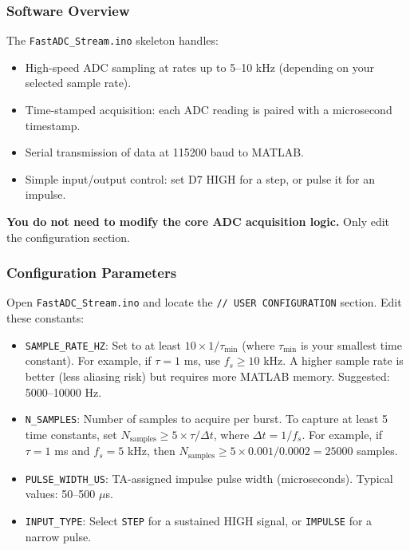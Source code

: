 \documentclass[11pt,letterpaper]{article}
\begin{document}
\subsubsection*{Software Overview}

The \texttt{FastADC\_Stream.ino} skeleton handles:
\begin{itemize}
    \item High-speed ADC sampling at rates up to 5--10 kHz (depending on your selected sample rate).
    \item Time-stamped acquisition: each ADC reading is paired with a microsecond timestamp.
    \item Serial transmission of data at 115200 baud to MATLAB.
    \item Simple input/output control: set D7 HIGH for a step, or pulse it for an impulse.
\end{itemize}

\noindent
\textbf{You do not need to modify the core ADC acquisition logic.} Only edit the configuration section.

\subsubsection*{Configuration Parameters}

Open \texttt{FastADC\_Stream.ino} and locate the \texttt{// USER CONFIGURATION} section. Edit these constants:

\begin{itemize}
    \item \texttt{SAMPLE\_RATE\_HZ}: Set to at least $10 \times 1/\tau_{\min}$ (where $\tau_{\min}$ is your smallest time constant). For example, if $\tau = 1$ ms, use $f_s \ge 10$ kHz. A higher sample rate is better (less aliasing risk) but requires more MATLAB memory. Suggested: 5000--10000 Hz.

    \item \texttt{N\_SAMPLES}: Number of samples to acquire per burst. To capture at least 5 time constants, set $N_{\text{samples}} \ge 5 \times \tau / \Delta t$, where $\Delta t = 1/f_s$. For example, if $\tau = 1$ ms and $f_s = 5$ kHz, then $N_{\text{samples}} \ge 5 \times 0.001 / 0.0002 = 25000$ samples.

    \item \texttt{PULSE\_WIDTH\_US}: TA-assigned impulse pulse width (microseconds). Typical values: 50--500 $\mu$s.

    \item \texttt{INPUT\_TYPE}: Select \texttt{STEP} for a sustained HIGH signal, or \texttt{IMPULSE} for a narrow pulse.
\end{itemize}
\end{document}
